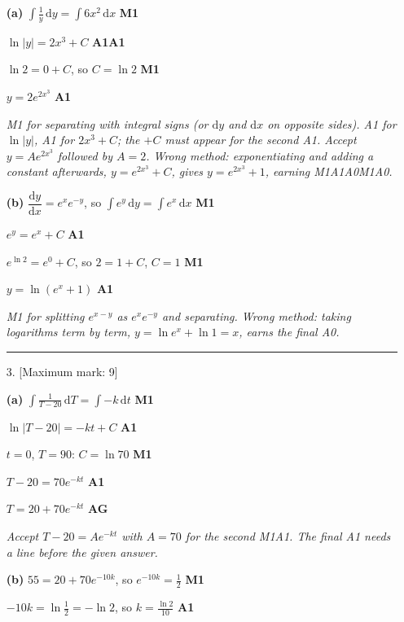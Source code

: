 \documentclass[12pt, twoside]{article}
\begin{document}
\begin{enumerate}[itemsep=0.3cm]
\textbf{(a)} $\displaystyle\int \frac{1}{y}\,\mathrm{d}y = \int 6x^{2}\,\mathrm{d}x$
\hfill \textbf{M1}

$\ln|y| = 2x^{3} + C$ \hfill \textbf{A1A1}

$\ln 2 = 0 + C$, so $C = \ln 2$ \hfill \textbf{M1}

$y = 2e^{2x^{3}}$ \hfill \textbf{A1}

\emph{M1 for separating with integral signs (or $\mathrm{d}y$ and
$\mathrm{d}x$ on opposite sides). A1 for $\ln|y|$, A1 for $2x^{3} + C$; the
$+C$ must appear for the second A1. Accept $y = Ae^{2x^{3}}$ followed by
$A = 2$. Wrong method: exponentiating and adding a constant afterwards,
$y = e^{2x^{3}} + C$, gives $y = e^{2x^{3}} + 1$, earning M1A1A0M1A0.}

\textbf{(b)} $\dfrac{\mathrm{d}y}{\mathrm{d}x} = e^{x}e^{-y}$, so
$\displaystyle\int e^{y}\,\mathrm{d}y = \int e^{x}\,\mathrm{d}x$
\hfill \textbf{M1}

$e^{y} = e^{x} + C$ \hfill \textbf{A1}

$e^{\ln 2} = e^{0} + C$, so $2 = 1 + C$, $C = 1$ \hfill \textbf{M1}

$y = \ln\left(e^{x} + 1\right)$ \hfill \textbf{A1}

\emph{M1 for splitting $e^{x - y}$ as $e^{x}e^{-y}$ and separating. Wrong
method: taking logarithms term by term, $y = \ln e^{x} + \ln 1 = x$, earns
the final A0.}

\bigskip \hrule \bigskip

\item[3.] [Maximum mark: 9]

\textbf{(a)} $\displaystyle\int \frac{1}{T - 20}\,\mathrm{d}T = \int -k\,\mathrm{d}t$
\hfill \textbf{M1}

$\ln|T - 20| = -kt + C$ \hfill \textbf{A1}

$t = 0$, $T = 90$: $C = \ln 70$ \hfill \textbf{M1}

$T - 20 = 70e^{-kt}$ \hfill \textbf{A1}

$T = 20 + 70e^{-kt}$ \hfill \textbf{AG}

\emph{Accept $T - 20 = Ae^{-kt}$ with $A = 70$ for the second M1A1.
The final A1 needs a line before the given answer.}

\textbf{(b)} $55 = 20 + 70e^{-10k}$, so $e^{-10k} = \frac{1}{2}$
\hfill \textbf{M1}

$-10k = \ln\frac{1}{2} = -\ln 2$, so $k = \frac{\ln 2}{10}$ \hfill \textbf{A1}


\end{enumerate}
\end{document}
